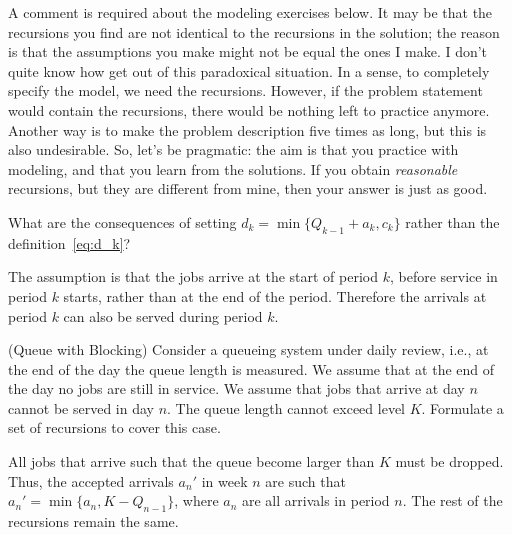 A comment is required about the modeling exercises below. It may be
that the recursions you find are not identical to the recursions in
the solution; the reason is that the assumptions you make might not be
equal the ones I make. I don't quite know how get out of this
paradoxical situation.  In a sense, to completely specify the model,
we need the recursions. However, if the problem statement would
contain the recursions, there would be nothing left to practice
anymore. Another way is to make the problem description five times as
long, but this is also undesirable. So, let's be pragmatic: the aim is
that you practice with modeling, and that you learn from the
solutions.  If you obtain \emph{reasonable} recursions, but they are
different from mine, then your answer is just as good.

\begin{question}
 What are the consequences of setting
    $d_k = \min\{Q_{k-1}+a_k,  c_k\}$ rather than the definition~\eqref{eq:d_k}?
\begin{solution}
 The assumption is that the jobs arrive at the start of period
    $k$, before service in period $k$ starts, rather than at the end
    of the period. Therefore the arrivals at period $k$ can also be
    served during period $k$.
\end{solution}
\end{question}


\begin{question} (Queue with Blocking) Consider a queueing system
  under daily review, i.e., at the end of the day the queue length is
  measured. We assume that at the end of the day no jobs are still in
  service. We assume that jobs that arrive at day $n$ cannot be served
  in day $n$. The queue length cannot exceed level $K$.  Formulate a
  set of recursions to cover this case.
  \begin{solution}

    All jobs that arrive such that the queue become larger than $K$
    must be dropped. Thus, the accepted arrivals $a_n'$ in week $n$
    are such that $a_n' = \min\{a_n, K-Q_{n-1}\}$, where $a_n$ are all
    arrivals in period $n$.  The rest of the recursions remain the
    same.

  \end{solution}
\end{question}


